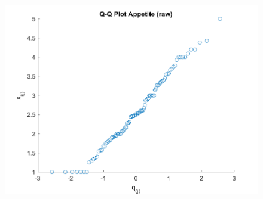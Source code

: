 \begin{center}
    \begin{figure}[H]
        \centering
        \includegraphics[scale=0.6]{./matlab/chapter-4/sol4.32.qq.5.png}
    \end{figure}
\end{center}